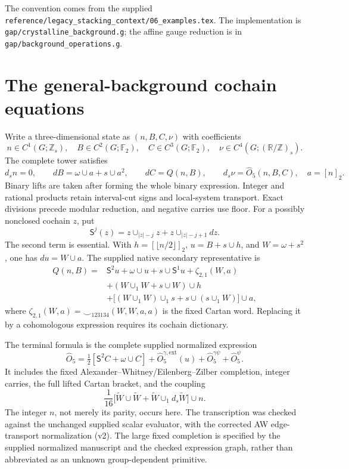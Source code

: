 \documentclass[11pt]{article}
\newcommand{\F}{\mathbb F_2}
\newcommand{\Z}{\mathbb Z}
\newcommand{\U}{(\mathbb R/\mathbb Z)}
\newcommand{\SSq}{\mathsf S}
\newcommand{\lift}[1]{\widetilde{#1}}
\newcommand{\ds}{d_s}
\newcommand{\OO}{\widehat O}
\newcommand{\pathref}[1]{{\small\nolinkurl{#1}}}
\begin{document}
The convention comes from the supplied
\pathref{reference/legacy_stacking_context/06_examples.tex}.
The implementation is \pathref{gap/crystalline_background.g}; the
affine gauge reduction is in \pathref{gap/background_operations.g}.

\newpage
\section{The general-background cochain equations}
Write a three-dimensional state as $(n,B,C,\nu)$ with coefficients
\begin{equation}
 n\in C^1(G;\Z_s),\quad B\in C^2(G;\F),\quad
 C\in C^3(G;\F),\quad\nu\in C^4(G;\U_s).
\end{equation}
The complete tower satisfies
\begin{equation}\label{eq:tower}
 \ds n=0,\qquad dB=\omega\cup a+s\cup a^2,
 \qquad dC=Q(n,B),\qquad\ds\nu=\OO_5(n,B,C),
 \quad a=[n]_2.
\end{equation}
Binary lifts are taken after forming the whole binary expression.
Integer and rational products retain interval-cut signs and local-system
transport. Exact divisions precede modular reduction, and negative
carries use floor. For a possibly nonclosed cochain $z$, put
\begin{equation}
 \SSq^j(z)=z\cup_{|z|-j}z+z\cup_{|z|-j+1}dz.
\end{equation}
The second term is essential. With
$h=[\lfloor n/2\rfloor]_2$, $u=B+s\cup h$, and $W=\omega+s^2$,
one has $du=W\cup a$. The supplied native secondary representative is
\begin{align}\label{eq:Q}
 Q(n,B)={}&\SSq^2u+\omega\cup u+s\cup\SSq^1u
       +\zeta_{2,1}(W,a)\nonumber\\
 &+(W\cup_1W+s\cup W)\cup h\nonumber\\
 &+\bigl[(W\cup_1W)\cup_1s+s\cup(s\cup_1W)\bigr]\cup a,
\end{align}
where $\zeta_{2,1}(W,a)=\smile_{123134}(W,W,a,a)$ is the fixed
Cartan word. Replacing it by a cohomologous expression requires its
cochain dictionary.

The terminal formula is the complete supplied normalized expression
\begin{equation}\label{eq:O}
 \OO_5=\tfrac12[\SSq^2C+\omega\cup C]
 +\OO_5^{\gamma,\mathrm{ext}}(u)
 +\OO_5^{\gamma\psi}+\OO_5^\psi.
\end{equation}
It includes the fixed Alexander--Whitney/Eilenberg--Zilber completion,
integer carries, the full lifted Cartan bracket, and the coupling
\begin{equation}
 \frac1{16}\bigl[\lift W\cup\lift W+
      \lift W\cup_1\ds\lift W\bigr]\cup n.
\end{equation}
The integer $n$, not merely its parity, occurs here. The transcription
was checked against the unchanged supplied scalar evaluator, with
the corrected AW edge-transport normalization (v2). The large
fixed completion is specified by the supplied normalized manuscript and
the checked expression graph, rather than abbreviated as an unknown
group-dependent primitive.
\end{document}
